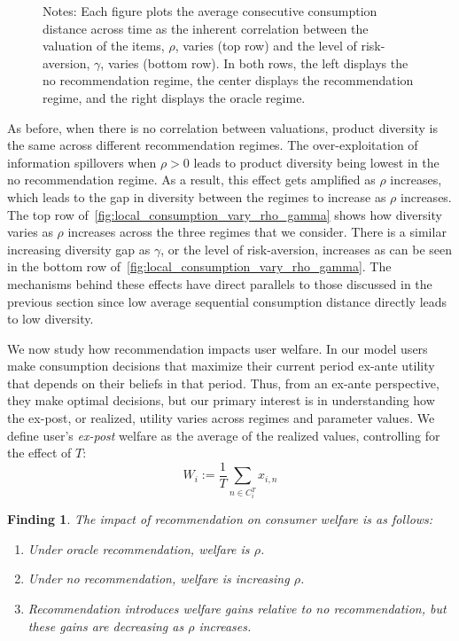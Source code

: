 \documentclass[manuscript]{acmart}
\newtheorem{finding}{Finding}
\begin{document}
\begin{figure}[t]
\begin{subfigure}{.3\textwidth}
\end{subfigure}%
\caption*{\scriptsize Notes: Each figure plots the average consecutive consumption distance across time as the inherent correlation between the valuation of the items, $\rho$, varies (top row) and the level of risk-aversion, $\gamma$, varies (bottom row). In both rows, the left displays the no recommendation regime, the center displays the recommendation regime, and the right displays the oracle regime.}
\label{fig:local_consumption_vary_rho_gamma}
\end{figure}
\addtocounter{figure}{-1}
As before, when there is no correlation between valuations, product diversity is the same across different recommendation regimes. The over-exploitation of information spillovers when $\rho > 0$ leads to product diversity being lowest in the no recommendation regime. As a result, this effect gets amplified as $\rho$ increases, which leads to the gap in diversity between the regimes to increase as $\rho$ increases. The top row of~\autoref{fig:local_consumption_vary_rho_gamma} shows how diversity varies as $\rho$ increases across the three regimes that we consider. There is a similar increasing diversity gap as $\gamma$, or the level of risk-aversion, increases as can be seen in the bottom row of~\autoref{fig:local_consumption_vary_rho_gamma}. The mechanisms behind these effects have direct parallels to those discussed in the previous section since low average sequential consumption distance directly leads to low diversity.
\par 

We now study how recommendation impacts user welfare. In our model users make consumption decisions that maximize their current period ex-ante utility that depends on their beliefs in that period. Thus, from an ex-ante perspective, they make optimal decisions, but our primary interest is in understanding how the ex-post, or realized, utility varies across regimes and parameter values. We define user's \textit{ex-post} welfare as the average of the realized values, controlling for the effect of $T$:
$$W_i:= \frac{1}{T}\sum_{n \in C_i^T} x_{i,n}$$

\begin{finding}\label{finding_welfare_gap}
The impact of recommendation on consumer welfare is as follows:
\begin{enumerate}
\item Under oracle recommendation, welfare is $\rho$.
\item Under no recommendation, welfare is increasing  $\rho$.
\item Recommendation introduces welfare gains relative to no recommendation, but these gains are decreasing as $\rho$ increases.
\end{enumerate}
\end{finding}
\par 
\end{document}
